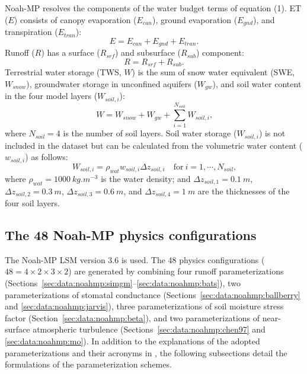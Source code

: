 \documentclass[essd, manuscript]{copernicus}
\begin{document}
Noah-MP resolves the components of the water budget terms of equation (1). ET (\(E\)) consists of canopy evaporation (\(E_{can}\)), ground evaporation (\(E_{gnd}\)), and transpiration (\(E_{tran}\)):
\begin{equation}
  E = E_{can} + E_{gnd} + E_{tran}
  \text{.}
\end{equation}
Runoff (\(R\)) has a surface (\(R_{srf}\)) and subsurface (\(R_{sub}\)) component:
\begin{equation}
  R = R_{srf} + R_{sub}
  \text{.}
\end{equation}
Terrestrial water storage (TWS, \(W\)) is the sum of snow water equivalent (SWE, \(W_{snow}\)), groundwater storage in unconfined aquifers (\(W_{gw}\)), and soil water content in the four model layers (\(W_{soil,i}\)):
\begin{equation}
  W = W_{snow} + W_{gw} + \sum_{i=1}^{N_{soil}} W_{soil,i}
  \text{,}
\end{equation}
where \(N_{soil} = 4\) is the number of soil layers. Soil water storage (\(W_{soil,i}\)) is not included in the dataset but can be calculated from the volumetric water content (\(w_{soil,i}\)) as follows:
\begin{equation}
  W_{soil,i} = \rho_{wat} w_{soil,i} \Delta z_{soil,i} \quad \mathrm{for}\ i = 1, \cdots, N_{soil}
  \text{,}
\end{equation}
where \(\rho_{wat} = \qty{1000}{kg.m^{-3}}\) is the water density; and \(\Delta z_{soil,1} = \qty{0.1}{m}\), \(\Delta z_{soil,2} = \qty{0.3}{m}\), \(\Delta z_{soil,3} = \qty{0.6}{m}\), and \(\Delta z_{soil,4} = \qty{1}{m}\) are the thicknesses of the four soil layers.

\subsection{The 48 Noah-MP physics configurations}\label{sec:data:noahmp}

The Noah-MP LSM version 3.6 is used. The 48 physics configurations (\(48 = 4 \times 2 \times 3 \times 2\)) are generated by combining four runoff parameterizations (Sections~\ref{sec:data:noahmp:simgm}--\ref{sec:data:noahmp:bats}), two parameterizations of stomatal conductance (Sections~\ref{sec:data:noahmp:ballberry} and \ref{sec:data:noahmp:jarvis}), three parameterizations of soil moisture stress factor (Section~\ref{sec:data:noahmp:beta}), and two parameterizations of near-surface atmospheric turbulence (Sections~\ref{sec:data:noahmp:chen97} and \ref{sec:data:noahmp:mo}). In addition to the explanations of the adopted parameterizations and their acronyms in \citet[Table 1]{zheng2019WRR}, the following subsections detail the formulations of the parameterization schemes.
\end{document}
